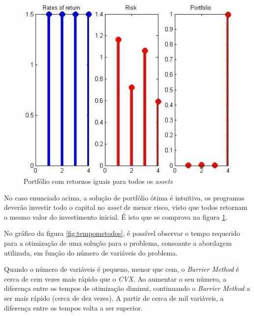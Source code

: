 \documentclass[a4paper]{IEEEtran}
\begin{document}
\begin{itemize}
\begin{figure}[htp]
\captionsetup{font=scriptsize}  
  \centering
  \includegraphics[width=0.9\columnwidth]{./miu_igual_risco_diferente}
  \caption{Portfólio com retornos iguais para todos os \textit{assets}}
  \label{fig:caso4}
\end{figure}

No caso enunciado acima, a solução de portfólio ótima é intuitiva, os programas deverão investir todo o capital no \textit{asset} de menor risco, visto que todos retornam o mesmo valor do investimento inicial. É isto que se comprova na figura \ref{fig:caso4}.

\end{itemize} 

No gráfico da figura \ref{fig:tempometodos}, é possível observar o tempo requerido para a otimização de uma solução para o problema, consoante a abordagem utilizada, em função do número de variáveis do problema.

Quando o número de variáveis é pequeno, menor que cem, o \textit{Barrier Method} é cerca de cem vezes mais rápido que o \textit{CVX}. Ao aumentar o seu número, a diferença entre os tempos de otimização diminui, continuando o \textit{Barrier Method} a ser mais rápido (cerca de dez vezes). A partir de cerca de mil variáveis, a diferença entre os tempos volta a ser superior.
\end{document}
